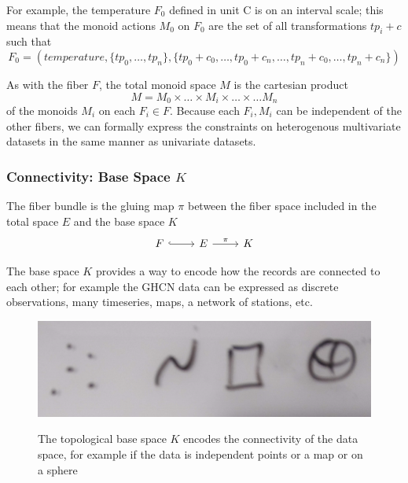 \documentclass[../main.tex]{subfiles}
\begin{document}
For example, the temperature $F_0$ defined in unit \textdegree C is on an interval scale; this means that the monoid actions $M_0$ on $F_0$ are the set of all transformations $tp_i + c$ such that %
\begin{equation}
F_0 = (\textit{temperature}, \{tp_0, \ldots, tp_n\}, \{tp_0 + c_0, \ldots, tp_0 + c_n, \ldots, tp_n + c_0, \ldots, tp_n + c_n\} ) 
\end{equation} 


As with the fiber $F$, the total monoid space $M$ is the cartesian product
\begin{equation}
M = M_{0} \times \ldots \times M_{i}\times \ldots \times\ldots M_{n}
\end{equation}
of the monoids $M_{i}$ on each $F_{i}\in F$. Because each $F_i, M_i$ can be independent of the other fibers, we can formally express the constraints on heterogenous multivariate datasets in the same manner as univariate datasets. 

\subsubsection{Connectivity: Base Space $K$} 
\label{sec:data_base}
The fiber bundle is the gluing map $\pi$ between the fiber space included in the total space $E$ and the base space $K$
\begin{equation}
    \label{eq:fiber_bundle}
    \begin{tikzcd}
        F \arrow[r, hook] & E \arrow[r, "\pi"] & K
    \end{tikzcd}
\end{equation}

The base space $K$ provides a way to encode how the records are connected to each other; for example the GHCN data can be expressed as discrete observations, many timeseries, maps, a network of stations, etc.

\begin{figure}[ht!]
    \includegraphics[width=.5\textwidth]{figures/math/k_different_types.png}
    \label{fig:base_space_types}
    \caption{The topological base space $K$ encodes the connectivity of the data space, for example if the data is independent points or a map or on a sphere}
\end{figure}
\end{document}
